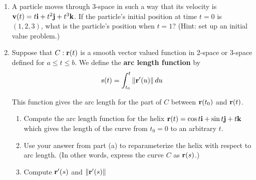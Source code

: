 \documentclass[12pt]{article}
\newif\ifans
\begin{document}
\begin{enumerate}
\item A particle moves through 3-space in such a way that its velocity is ${\bf v}(t)=t{\bf i}+t^2{\bf j}+t^3{\bf k}$.  If the particle's initial position at time $t=0$ is $(1,2,3)$, what is the particle's position when $t=1$? (Hint: set up an initial value problem.)

\ifans{\fbox{\parbox{1\linewidth}{The position of the particle at time $t=1$ is $(x,y,z)=\left( \frac{3}{2}, \frac{7}{3}, \frac{13}{4}\right)$.}}} \fi

\item Suppose that $C: {\bf r}(t)$ is a smooth vector valued function in 2-space or 3-space defined for $a \leq t \leq b$.  We define the {\bf arc length function} by $$s(t)=\int_{t_0}^t \|{\bf r}^{\prime}(u)\| \,du$$

This function gives the arc length for the part of $C$ between ${\bf r}(t_0)$ and ${\bf r}(t)$.

\begin{enumerate}

\item Compute the arc length function for the helix ${\bf r}(t)=\cos{t} {\bf i}+\sin{t} {\bf j}+t {\bf k}$ which gives the length of the curve from $t_0=0$ to an arbitrary $t$.

\ifans{\fbox{$s=\sqrt{2}t$}} \fi

\item Use your answer from part (a) to reparameterize the helix with respect to arc length. (In other words, express the curve $C$ as ${\bf r}(s)$.)

\ifans{\fbox{${\bf r}(s)=\cos\left(\frac{s}{\sqrt{2}}\right){\bf i}+\sin\left(\frac{s}{\sqrt{2}}\right){\bf j}+\frac{s}{\sqrt{2}}{\bf k}$}} \fi

\item Compute ${\bf r}^{\prime}(s)$ and $\|{\bf r}^{\prime}(s)\|$

\ifans{\fbox{\parbox{1\linewidth}{${\bf r}^{\prime}(s)=-\frac{1}{\sqrt{2}}\sin\left(\frac{s}{\sqrt{2}}\right){\bf i}+\frac{1}{\sqrt{2}}\cos\left(\frac{s}{\sqrt{2}}\right){\bf j}+\frac{1}{\sqrt{2}}{\bf k}$ and $\|{\bf r}^{\prime}(s)\|=1$\\
In fact, whenever a curve is parameterized in terms of arc length, it can be shown using the chain rule that all tangent vectors will be unit tangent vectors.
}}} \fi

\end{enumerate}

\newpage


\end{enumerate}
\end{document}

